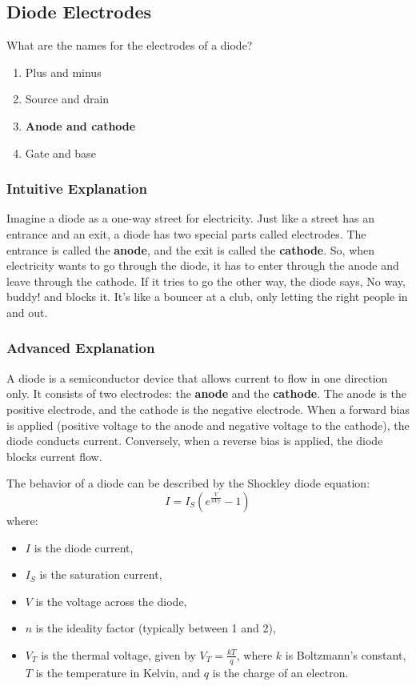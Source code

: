 \subsection{Diode Electrodes}
\label{T6B09}

\begin{tcolorbox}[colback=gray!10!white,colframe=black!75!black,title=T6B09]
What are the names for the electrodes of a diode?
\begin{enumerate}[label=\Alph*]
    \item Plus and minus
    \item Source and drain
    \item \textbf{Anode and cathode}
    \item Gate and base
\end{enumerate}
\end{tcolorbox}

\subsubsection{Intuitive Explanation}
Imagine a diode as a one-way street for electricity. Just like a street has an entrance and an exit, a diode has two special parts called electrodes. The entrance is called the \textbf{anode}, and the exit is called the \textbf{cathode}. So, when electricity wants to go through the diode, it has to enter through the anode and leave through the cathode. If it tries to go the other way, the diode says, No way, buddy! and blocks it. It's like a bouncer at a club, only letting the right people in and out.

\subsubsection{Advanced Explanation}
A diode is a semiconductor device that allows current to flow in one direction only. It consists of two electrodes: the \textbf{anode} and the \textbf{cathode}. The anode is the positive electrode, and the cathode is the negative electrode. When a forward bias is applied (positive voltage to the anode and negative voltage to the cathode), the diode conducts current. Conversely, when a reverse bias is applied, the diode blocks current flow.

The behavior of a diode can be described by the Shockley diode equation:
\[
I = I_S \left( e^{\frac{V}{nV_T}} - 1 \right)
\]
where:
\begin{itemize}
    \item \( I \) is the diode current,
    \item \( I_S \) is the saturation current,
    \item \( V \) is the voltage across the diode,
    \item \( n \) is the ideality factor (typically between 1 and 2),
    \item \( V_T \) is the thermal voltage, given by \( V_T = \frac{kT}{q} \), where \( k \) is Boltzmann's constant, \( T \) is the temperature in Kelvin, and \( q \) is the charge of an electron.
\end{itemize}

